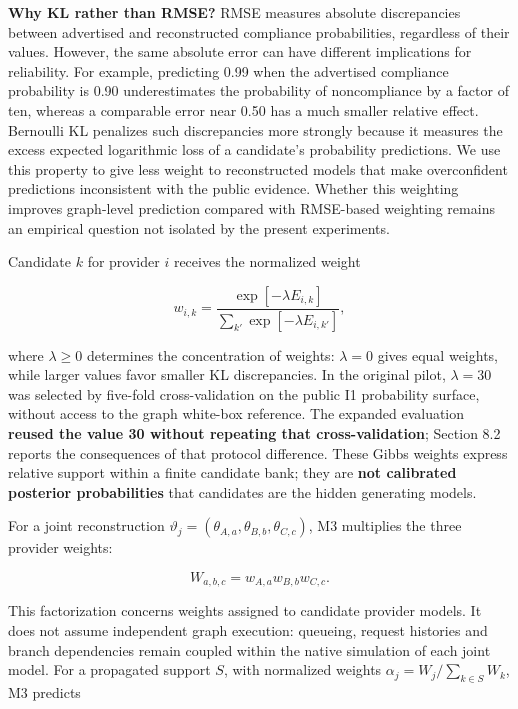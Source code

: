 \documentclass[10pt,a4paper]{article}
\begin{document}
\textbf{Why KL rather than RMSE?} RMSE measures absolute discrepancies between advertised and reconstructed compliance probabilities, regardless of their values. However, the same absolute error can have different implications for reliability. For example, predicting 0.99 when the advertised compliance probability is 0.90 underestimates the probability of noncompliance by a factor of ten, whereas a comparable error near 0.50 has a much smaller relative effect. Bernoulli KL penalizes such discrepancies more strongly because it measures the excess expected logarithmic loss of a candidate's probability predictions. We use this property to give less weight to reconstructed models that make overconfident predictions inconsistent with the public evidence. Whether this weighting improves graph-level prediction compared with RMSE-based weighting remains an empirical question not isolated by the present experiments.

Candidate $k$ for provider $i$ receives the normalized weight

\begin{equation*}
w_{i,k}
=\frac{\exp[-\lambda E_{i,k}]}
{\sum_{k'}\exp[-\lambda E_{i,k'}]},
\tag{12}
\end{equation*}

where $\lambda\ge0$ determines the concentration of weights: $\lambda=0$ gives equal weights, while larger values favor smaller KL discrepancies. In the original pilot, $\lambda=30$ was selected by five-fold cross-validation on the public I1 probability surface, without access to the graph white-box reference. The expanded evaluation \textbf{reused the value 30 without repeating that cross-validation}; Section 8.2 reports the consequences of that protocol difference. These Gibbs weights express relative support within a finite candidate bank; they are \textbf{not calibrated posterior probabilities} that candidates are the hidden generating models.

For a joint reconstruction $\vartheta_j=(\theta_{A,a},\theta_{B,b},\theta_{C,c})$, M3 multiplies the three provider weights:

\begin{equation*}
W_{a,b,c}=w_{A,a}w_{B,b}w_{C,c}.
\tag{13}
\end{equation*}

This factorization concerns weights assigned to candidate provider models. It does not assume independent graph execution: queueing, request histories and branch dependencies remain coupled within the native simulation of each joint model. For a propagated support $S$, with normalized weights $\alpha_j=W_j/\sum_{k\in S}W_k$, M3 predicts
\end{document}
